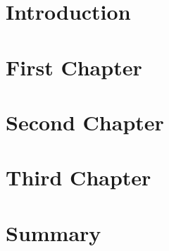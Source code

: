 

\chapter{Introduction}\label{chapter:introduction} %

\chapter{First Chapter}\label{chapter:method}


\chapter{Second Chapter}\label{chapter:results}


\chapter{Third Chapter}\label{chapter:discussion}


\chapter{Summary}\label{chapter:summary} 



